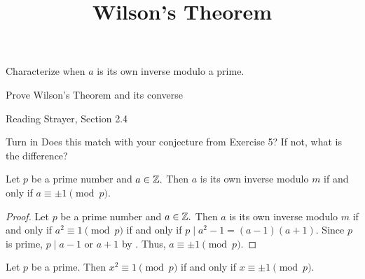 \documentclass{ximera}
\title{Wilson's Theorem}
\begin{document}
\begin{abstract}
\end{abstract}
\maketitle


\begin{obj}
    \item Characterize when $a$ is its own inverse modulo a prime.

    \item Prove Wilson's Theorem and its converse
\end{obj}


\begin{pre}
    \item[Reading] Strayer, Section 2.4

    \item[Turn in]
    Does this match with your conjecture from Exercise 5? If not, what is the difference?
\end{pre}




\begin{lemma}\label{lem:sqrt1}
    Let $p$ be a prime number and $a\in\mathbb Z.$ Then $a$ is its own inverse modulo $m$ if and only if $a\equiv \pm 1\pmod{p}.$
\end{lemma}

\begin{proof}
    Let $p$ be a prime number and $a\in\mathbb Z.$ Then $a$ is its own inverse modulo $m$ if and only if $a^2\equiv 1 \pmod{p}$ if and only if $p\mid a^2-1=(a-1)(a+1).$ Since $p$ is prime, $p\mid a-1$ or $a+1$ by . Thus, $a\equiv\pm 1\pmod p.$
\end{proof}

\begin{corollary}\label{cor:sqrt1}
    Let $p$ be a prime. Then $x^2\equiv 1\pmod{p}$ if and only if $x\equiv \pm 1\pmod{p}.$
\end{corollary}
\end{document}
